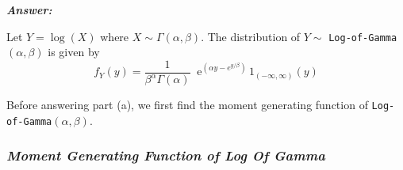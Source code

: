 \documentclass[12pt]{article}
\begin{document}
 \textbf{\color{TealBlue}\emph{Answer:} } 

Let $Y = \log (X)$ where  $X\sim\Gamma(\alpha,\beta)$.  
The distribution of $Y \sim $ \texttt{Log-of-Gamma}$(\alpha, \beta)$ is given by
$$
f_Y(y) = \frac{1}{\beta^\alpha \Gamma(\alpha)} \;\; \mathrm{e}^{\left(\alpha y - e^{y/\beta}\right)}\,1_{(-\infty,\infty)}(y)
$$


Before answering part (a), we first find the moment generating function of \texttt{Log-of-Gamma}$(\alpha, \beta)$.

\begin{center}
\subsubsection*{\color{TealBlue}\emph{Moment Generating Function of Log Of Gamma}}
\end{center}
\end{document}
